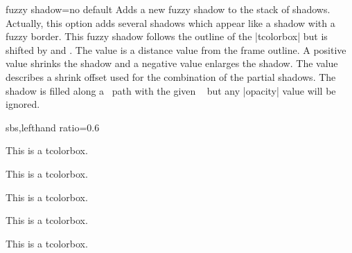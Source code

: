 \clearpage
\begin{docTcbKey}{fuzzy shadow}{=}{no default}
  Adds a new fuzzy shadow to the stack of shadows. Actually, this option
  adds several shadows which appear like a shadow with a fuzzy border.
  This fuzzy shadow follows the outline of the |tcolorbox| but is shifted by
   and . The  value is a distance value
  from the frame outline.  A positive  value shrinks the shadow
  and a negative  value enlarges the shadow.
  The  value describes a shrink
  offset used for the combination of the partial shadows.
  The shadow is filled along a \tikzname\  path with the given \tikzname\   but
  any |opacity| value will be ignored.
\begin{dispExample*}{sbs,lefthand ratio=0.6}

\begin{tcolorbox}[title=My own shadow,
  fuzzy shadow={2mm}{-1mm}{0mm}{0.1mm}%
               {black!50!white}]
This is a tcolorbox.
\end{tcolorbox}
\par\bigskip
\begin{tcolorbox}[title=Another shadow,
  fuzzy shadow={-1mm}{-2mm}{0mm}{0.2mm}%
               {fill=blue}]
This is a tcolorbox.
\end{tcolorbox}
\par\bigskip
\begin{tcolorbox}[title=Double shadow,
  fuzzy shadow={-1.5mm}{-1.5mm}{0mm}{0.1mm}%
               {blue},
  fuzzy shadow={1.5mm}{-1.5mm}{0mm}{0.1mm}%
               {red}]
This is a tcolorbox.
\end{tcolorbox}
\par\bigskip
\begin{tcolorbox}[title=Far shadow,
  fuzzy shadow={5.5mm}{-3.5mm}{0mm}{0.3mm}%
               {black}]
This is a tcolorbox.
\end{tcolorbox}
\par\bigskip\bigskip
\begin{tcolorbox}[title=Glow shadow,
  fuzzy shadow={0mm}{0mm}{-1.5mm}{0.15mm}%
               {yellow!75!red}]
This is a tcolorbox.
\end{tcolorbox}
\end{dispExample*}

\end{docTcbKey}


